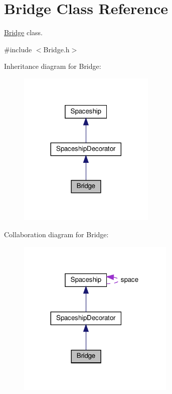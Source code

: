 \hypertarget{classBridge}{}\section{Bridge Class Reference}
\label{classBridge}


\hyperlink{classBridge}{Bridge} class.  




{\ttfamily \#include $<$Bridge.\+h$>$}



Inheritance diagram for Bridge\+:\nopagebreak
\begin{figure}[H]
\begin{center}
\leavevmode
\includegraphics[width=185pt]{classBridge__inherit__graph}
\end{center}
\end{figure}


Collaboration diagram for Bridge\+:\nopagebreak
\begin{figure}[H]
\begin{center}
\leavevmode
\includegraphics[width=212pt]{classBridge__coll__graph}
\end{center}
\end{figure}
